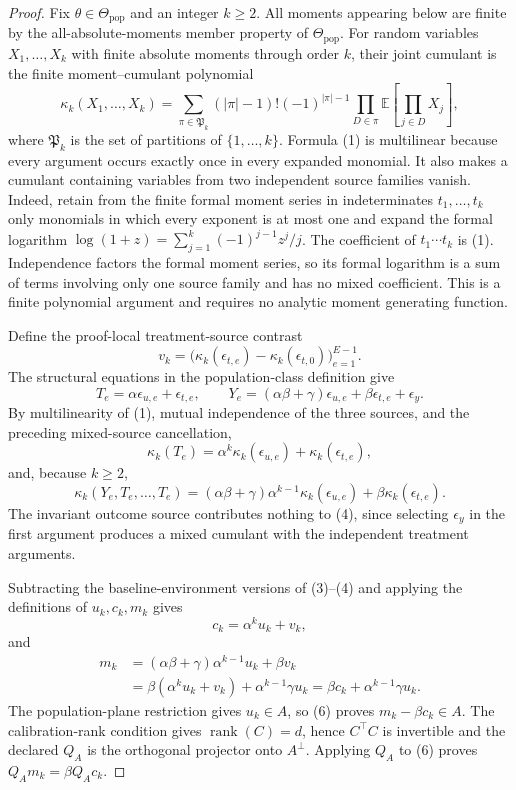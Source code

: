 \documentclass{article}
\begin{document}
\begin{proof}
Fix \(\theta\in\Theta_{\mathrm{pop}}\) and an integer \(k\geq2\).  All moments appearing below are finite by the all-absolute-moments member property of \(\Theta_{\mathrm{pop}}\).  For random variables \(X_1,\ldots,X_k\) with finite absolute moments through order \(k\), their joint cumulant is the finite moment--cumulant polynomial
\[
 \kappa_k(X_1,\ldots,X_k)
 =\sum_{\pi\in\mathfrak P_k}(|\pi|-1)!(-1)^{|\pi|-1}
   \prod_{D\in\pi}\mathbb E\!\left[\prod_{j\in D}X_j\right],             \tag{1}
\]
where \(\mathfrak P_k\) is the set of partitions of \(\{1,\ldots,k\}\).  Formula (1) is multilinear because every argument occurs exactly once in every expanded monomial.  It also makes a cumulant containing variables from two independent source families vanish.  Indeed, retain from the finite formal moment series in indeterminates \(t_1,\ldots,t_k\) only monomials in which every exponent is at most one and expand the formal logarithm \(\log(1+z)=\sum_{j=1}^k(-1)^{j-1}z^j/j\).  The coefficient of \(t_1\cdots t_k\) is (1).  Independence factors the formal moment series, so its formal logarithm is a sum of terms involving only one source family and has no mixed coefficient.  This is a finite polynomial argument and requires no analytic moment generating function.

Define the proof-local treatment-source contrast
\[
 v_k=\bigl(\kappa_k(\epsilon_{t,e})-
                 \kappa_k(\epsilon_{t,0})\bigr)_{e=1}^{E-1}.
\]
The structural equations in the population-class definition give
\[
 T_e=\alpha\epsilon_{u,e}+\epsilon_{t,e},
 \qquad
 Y_e=(\alpha\beta+\gamma)\epsilon_{u,e}
       +\beta\epsilon_{t,e}+\epsilon_y.                                  \tag{2}
\]
By multilinearity of (1), mutual independence of the three sources, and the preceding mixed-source cancellation,
\[
 \kappa_k(T_e)=\alpha^k\kappa_k(\epsilon_{u,e})
                  +\kappa_k(\epsilon_{t,e}),                              \tag{3}
\]
and, because \(k\geq2\),
\[
 \kappa_k(Y_e,T_e,\ldots,T_e)
 =(\alpha\beta+\gamma)\alpha^{k-1}\kappa_k(\epsilon_{u,e})
   +\beta\kappa_k(\epsilon_{t,e}).                                       \tag{4}
\]
The invariant outcome source contributes nothing to (4), since selecting \(\epsilon_y\) in the first argument produces a mixed cumulant with the independent treatment arguments.

Subtracting the baseline-environment versions of (3)--(4) and applying the definitions of \(u_k,c_k,m_k\) gives
\[
 c_k=\alpha^ku_k+v_k,                                                       \tag{5}
\]
and
\[
 \begin{aligned}
 m_k
 &=(\alpha\beta+\gamma)\alpha^{k-1}u_k+\beta v_k\\
 &=\beta(\alpha^ku_k+v_k)+\alpha^{k-1}\gamma u_k
  =\beta c_k+\alpha^{k-1}\gamma u_k.
 \end{aligned}                                                            \tag{6}
\]
The population-plane restriction gives \(u_k\in A\), so (6) proves \(m_k-\beta c_k\in A\).  The calibration-rank condition gives \(\operatorname{rank}(C)=d\), hence \(C^\top C\) is invertible and the declared \(Q_A\) is the orthogonal projector onto \(A^\perp\).  Applying \(Q_A\) to (6) proves \(Q_Am_k=\beta Q_Ac_k\).
\end{proof}
\end{document}

